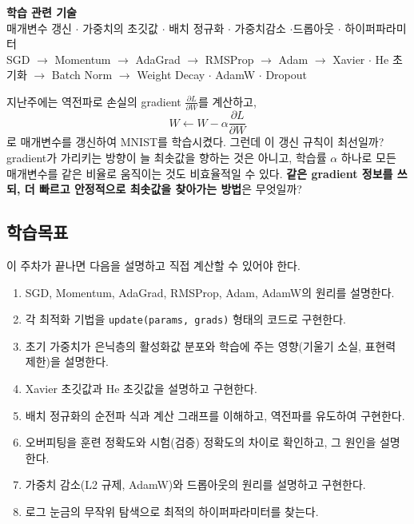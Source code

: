 \documentclass[11pt,a4paper]{article}
\newcommand{\pd}[2]{\frac{\partial #1}{\partial #2}}
\begin{document}

\begin{center}
{\LARGE\bfseries 학습 관련 기술}\\[0.35em]
{\large 매개변수 갱신 $\cdot$ 가중치의 초깃값 $\cdot$ 배치 정규화 $\cdot$ 가중치감소 $\cdot$드롭아웃 $\cdot$ 하이퍼파라미터}\\[0.35em]
{\normalsize SGD $\rightarrow$ Momentum $\rightarrow$ AdaGrad $\rightarrow$ RMSProp $\rightarrow$ Adam $\rightarrow$ Xavier $\cdot$ He 초기화 $\rightarrow$ Batch Norm $\rightarrow$ Weight Decay $\cdot$ AdamW $\cdot$ Dropout}\\[0.8em]
\end{center}

\vspace{0.4em}

\begin{keybox}[이번 주의 핵심 질문]
지난주에는 역전파로 손실의 gradient $\pd{L}{W}$를 계산하고,
\[
W\leftarrow W-\alpha\pd{L}{W}
\]
로 매개변수를 갱신하여 MNIST를 학습시켰다.
그런데 이 갱신 규칙이 최선일까?
gradient가 가리키는 방향이 늘 최솟값을 향하는 것은 아니고,
학습률 $\alpha$ 하나로 모든 매개변수를 같은 비율로 움직이는 것도 비효율적일 수 있다.
\textbf{같은 gradient 정보를 쓰되, 더 빠르고 안정적으로 최솟값을 찾아가는 방법}은 무엇일까?
\end{keybox}

\subsection*{학습목표}

이 주차가 끝나면 다음을 설명하고 직접 계산할 수 있어야 한다.

\begin{enumerate}[label=\arabic*.]
\item SGD, Momentum, AdaGrad, RMSProp, Adam, AdamW의 원리를 설명한다.
\item 각 최적화 기법을 \texttt{update(params, grads)} 형태의 코드로 구현한다.
\item 초기 가중치가 은닉층의 활성화값 분포와 학습에 주는 영향(기울기 소실, 표현력 제한)을 설명한다.
\item Xavier 초깃값과 He 초깃값을 설명하고 구현한다.
\item 배치 정규화의 순전파 식과 계산 그래프를 이해하고, 역전파를 유도하여 구현한다.
\item 오버피팅을 훈련 정확도와 시험(검증) 정확도의 차이로 확인하고, 그 원인을 설명한다.
\item 가중치 감소(L2 규제, AdamW)와 드롭아웃의 원리를 설명하고 구현한다.
\item 로그 눈금의 무작위 탐색으로 최적의 하이퍼파라미터를 찾는다.
\end{enumerate}
\end{document}
